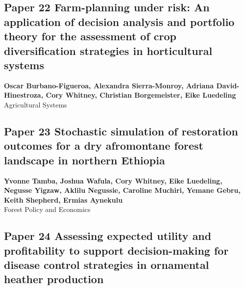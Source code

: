 \documentclass[
]{article}
\begin{document}
\newpage

\hypertarget{burbano-figueroa_farm-planning_2022}{%
\subsection{Paper 22 Farm-planning under risk: An application of
decision analysis and portfolio theory for the assessment of crop
diversification strategies in horticultural
systems}\label{burbano-figueroa_farm-planning_2022}}

\begin{center}
\vspace*{2cm}
{\Large \textbf{Oscar Burbano-Figueroa, Alexandra Sierra-Monroy, Adriana David-Hinestroza, Cory Whitney, Christian Borgemeister, Eike Luedeling}} \\[0.5cm]
\vspace*{1cm}
{\Large Agricultural Systems} \\[2cm]
\end{center}


\newpage

\hypertarget{tamba_stochastic_2021}{%
\subsection{Paper 23 Stochastic simulation of restoration outcomes for a
dry afromontane forest landscape in northern
Ethiopia}\label{tamba_stochastic_2021}}

\begin{center}
\vspace*{2cm}
{\Large \textbf{Yvonne Tamba, Joshua Wafula, Cory Whitney, Eike Luedeling, Negusse Yigzaw, Aklilu Negussie, Caroline Muchiri, Yemane Gebru, Keith Shepherd, Ermias Aynekulu}} \\[0.5cm]
\vspace*{1cm}
{\Large Forest Policy and Economics} \\[2cm]
\end{center}


\newpage

\hypertarget{ruett_assessing_2022}{%
\subsection{Paper 24 Assessing expected utility and profitability to
support decision-making for disease control strategies in ornamental
heather production}\label{ruett_assessing_2022}}
\end{document}

